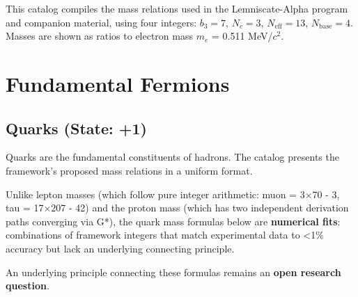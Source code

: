 \documentclass[
  11pt,
  letterpaper,
  twoside,
  openright]{book}
\begin{document}
\begin{tcolorbox}[enhanced jigsaw, coltitle=black, colbacktitle=quarto-callout-important-color!10!white, toprule=.15mm, colframe=quarto-callout-important-color-frame, arc=.35mm, opacityback=0, bottomtitle=1mm, toptitle=1mm, breakable, colback=white, titlerule=0mm, opacitybacktitle=0.6, title=\textcolor{quarto-callout-important-color}{\faExclamation}\hspace{0.5em}{Major Update: Masses Are Derived}, rightrule=.15mm, bottomrule=.15mm, leftrule=.75mm, left=2mm]

This catalog compiles the mass relations used in the Lemniscate-Alpha
program and companion material, using four integers: \(b_3=7\),
\(N_c=3\), \(N_{\text{eff}}=13\), \(N_{\text{base}}=4\). Masses are
shown as ratios to electron mass \(m_e\) = 0.511 MeV/\(c^2\).

\end{tcolorbox}

\section{Fundamental Fermions}\label{fundamental-fermions}

\subsection{Quarks (State: +1)}\label{quarks-state-1}

Quarks are the fundamental constituents of hadrons. The catalog presents
the framework's proposed mass relations in a uniform format.

\begin{tcolorbox}[enhanced jigsaw, coltitle=black, colbacktitle=quarto-callout-warning-color!10!white, toprule=.15mm, colframe=quarto-callout-warning-color-frame, arc=.35mm, opacityback=0, bottomtitle=1mm, toptitle=1mm, breakable, colback=white, titlerule=0mm, opacitybacktitle=0.6, title=\textcolor{quarto-callout-warning-color}{\faExclamationTriangle}\hspace{0.5em}{Epistemic Status: Numerical Fits}, rightrule=.15mm, bottomrule=.15mm, leftrule=.75mm, left=2mm]

Unlike lepton masses (which follow pure integer arithmetic: muon = 3×70
- 3, tau = 17×207 - 42) and the proton mass (which has two independent
derivation paths converging via G*), the quark mass formulas below are
\textbf{numerical fits}: combinations of framework integers that match
experimental data to \textless1\% accuracy but lack an underlying
connecting principle.

An underlying principle connecting these formulas remains an
\textbf{open research question}.

\end{tcolorbox}
\end{document}
